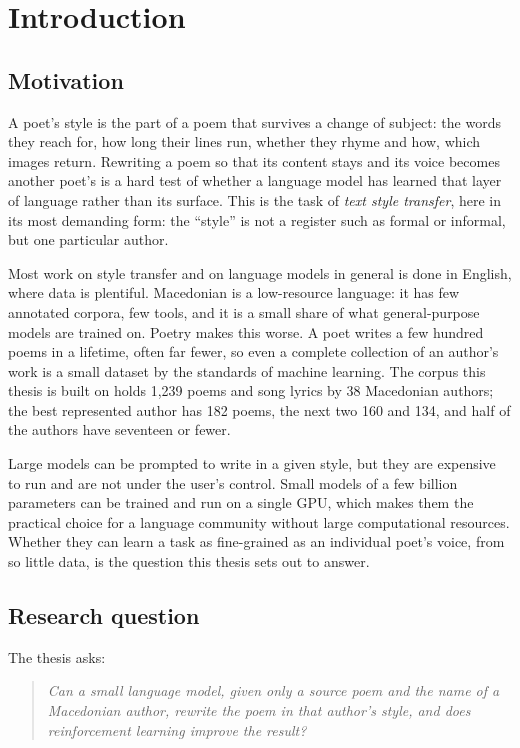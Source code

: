 \chapter{Introduction}\label{ch:intro}

\section{Motivation}

A poet's style is the part of a poem that survives a change of subject: the
words they reach for, how long their lines run, whether they rhyme and how,
which images return. Rewriting a poem so that its content stays and its
voice becomes another poet's is a hard test of whether a language model has
learned that layer of language rather than its surface. This is the task of
\emph{text style transfer}, here in its most demanding form: the ``style''
is not a register such as formal or informal, but one particular author.

Most work on style transfer and on language models in general is done in
English, where data is plentiful. Macedonian is a low-resource language: it
has few annotated corpora, few tools, and it is a small share of what
general-purpose models are trained on. Poetry makes this worse. A poet
writes a few hundred poems in a lifetime, often far fewer, so even a
complete collection of an author's work is a small dataset by the standards
of machine learning. The corpus this thesis is built on holds 1,239 poems
and song lyrics by 38 Macedonian authors; the best represented author has
182 poems, the next two 160 and 134, and half of the authors
have seventeen or fewer.

Large models can be prompted to write in a given style, but they are
expensive to run and are not under the user's control. Small models of a
few billion parameters can be trained and run on a single GPU, which makes
them the practical choice for a language community without large
computational resources. Whether they can learn a task as fine-grained as
an individual poet's voice, from so little data, is the question this
thesis sets out to answer.

\section{Research question}

The thesis asks:

\begin{quote}
\emph{Can a small language model, given only a source poem and the name of
a Macedonian author, rewrite the poem in that author's style, and does
reinforcement learning improve the result?}
\end{quote}

